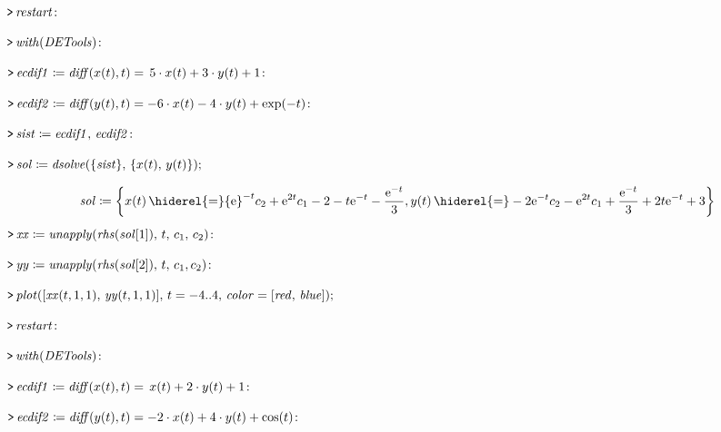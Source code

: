 \documentclass{article}
\begin{document}
{}
\mapleinput
{$ \displaystyle \texttt{>\,} \mathit{restart} \colon  $}

\mapleinput
{$ \displaystyle \texttt{>\,} \mathit{with} (\mathit{DETools})\colon  $}

\mapleinput
{$ \displaystyle \texttt{>\,} \mathit{ecdif1} \coloneqq \mathit{diff} (x (t),t)=\,5\cdot x (t)+3\cdot y (t)+1\colon  $}

\mapleinput
{$ \displaystyle \texttt{>\,} \mathit{ecdif2} \coloneqq \mathit{diff} (y (t),t)=-6\cdot x (t)-4\cdot y (t)+\exp (-t)\colon  $}

\mapleinput
{$ \displaystyle \texttt{>\,} \mathit{sist} \coloneqq \mathit{ecdif1} ,\,\mathit{ecdif2} \colon  $}

\mapleinput
{$ \displaystyle \texttt{>\,} \mathit{sol} \coloneqq \mathit{dsolve} (\{\mathit{sist} \},\,\{x (t),\,y (t)\}); $}

\begin{dmath}\label{(18)}
\mathit{sol} \coloneqq \left\{x \! \left(t \right) \hiderel{=} {\mathrm e}^{-t} c_{2}+{\mathrm e}^{2 t} c_{1}-2-t {\mathrm e}^{-t}-\frac{{\mathrm e}^{-t}}{3},
\\
y \! \left(t \right)\hiderel{=}-2 {\mathrm e}^{-t} c_{2}-{\mathrm e}^{2 t} c_{1}+\frac{{\mathrm e}^{-t}}{3}+2 t {\mathrm e}^{-t}+3\right\}
\end{dmath}
\mapleinput
{$ \displaystyle \texttt{>\,} \mathit{xx} \coloneqq \mathit{unapply} (\mathit{rhs} (\mathit{sol} [1]),\,t ,\,c_{1},\,c_{2})\colon  $}

\mapleinput
{$ \displaystyle \texttt{>\,} \mathit{yy} \coloneqq \mathit{unapply} (\mathit{rhs} (\mathit{sol} [2]),\,t ,\,c_{1},c_{2})\colon  $}

\mapleinput
{$ \displaystyle \texttt{>\,} \mathit{plot} ([\mathit{xx} (t ,1,1),\,\mathit{yy} (t ,1,1)],\,t =-4..4,\,\mathit{color} =[\mathit{red} ,\,\mathit{blue}]); $}

{}
\mapleinput
{$ \displaystyle \texttt{>\,} \mathit{restart} \colon  $}

\mapleinput
{$ \displaystyle \texttt{>\,} \mathit{with} (\mathit{DETools})\colon  $}

\mapleinput
{$ \displaystyle \texttt{>\,} \mathit{ecdif1} \coloneqq \mathit{diff} (x (t),t)=\,x (t)+2\cdot y (t)+1\colon  $}

\mapleinput
{$ \displaystyle \texttt{>\,} \mathit{ecdif2} \coloneqq \mathit{diff} (y (t),t)=-2\cdot x (t)+4\cdot y (t)+\cos (t)\colon  $}
\end{document}
